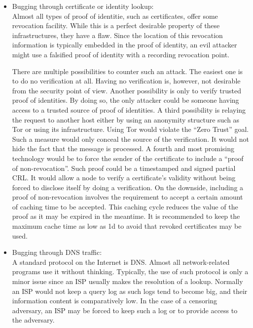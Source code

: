 \begin{itemize}
	\item Bugging through certificate or identity lookup:\\
	Almost all types of proof of identitie, such as certificates, offer some revocation facility. While this is a perfect desirable property of these infrastructures, they have a flaw. Since the location of this revocation information is typically embedded in the proof of identity, an evil attacker might use a falsified proof of identity with a recording revocation point.
	
	There are multiple possibilities to counter such an attack. The easiest one is to do no verification at all. Having no verification is, however, not desirable from the security point of view. Another possibility is only to verify trusted proof of identities. By doing so, the only attacker could be someone having access to a trusted source of proof of identities. A third possibility is relaying the request to another host either by using an anonymity structure such as Tor or using its infrastructure. Using Tor would violate the ``Zero Trust'' goal. Such a measure would only conceal the source of the verification. It would not hide the fact that the message is processed. A fourth and most promising technology would be to force the sender of the certificate to include a ``proof of non-revocation''. Such proof could be a timestamped and signed partial CRL. It would allow a node to verify a certificate's validity without being forced to disclose itself by doing a verification. On the downside, including a proof of non-revocation involves the requirement to accept a certain amount of caching time to be accepted. This caching cycle reduces the value of the proof as it may be expired in the meantime. It is recommended to keep the maximum cache time as low as 1d to avoid that revoked certificates may be used. 
	
	\item Bugging through DNS traffic:\\
	A standard protocol on the Internet is DNS. Almost all network-related programs use it without thinking. %
	 Typically, the use of such protocol is only a minor issue since an ISP usually makes the resolution of a lookup. Normally an ISP would not keep a query log as such logs tend to become big, and their information content is comparatively low. In the case of a censoring adversary, an ISP may be forced to keep such a log or to provide access to the adversary.
	

\end{itemize}
